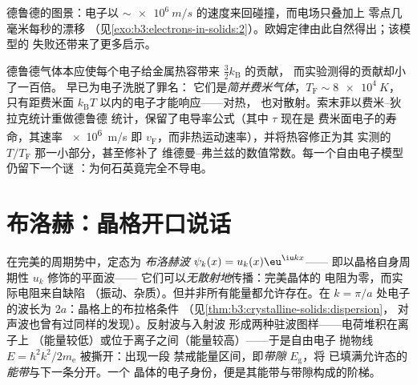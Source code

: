 \begin{omfigure}

{\small 德鲁德的图景：电子以
$\sim\qty{e6}{m/s}$ 的速度来回碰撞，而电场只叠加上
零点几毫米每秒的漂移
（见\cref{exo:b3:electrons-in-solids:2}）。欧姆定律由此自然得出；该模型的
失败还带来了更多启示。}
\end{omfigure}

\begin{remark}[索末菲的补救]\label{rem:b3:electrons-in-solids:sommerfeld}
德鲁德气体本应使每个电子给金属热容带来 $\tfrac32k_{\text{B}}$ 的贡献，
而实验测得的贡献却小了一百倍。
早已为电子洗脱了罪名：
它们是\emph{简并费米气体}，$T_{\text{F}} \sim
\qty{8e4}{K}$，只有距费米面
$k_{\text{B}}T$ 以内的电子才能响应——对热，
也对散射。索末菲以费米–狄拉克统计重做德鲁德
统计，保留了电导率公式（其中 $\tau$ 现在是
费米面电子的寿命，其速率 \qty{e6}{m/s} 即
$v_{\text{F}}$，而非热运动速率），并将热容修正为其
实测的 $T/T_{\text{F}}$ 那一小部分，甚至修补了
维德曼–弗兰兹的数值常数。每一个自由电子模型仍留下一个谜
：为何石英竟完全不导电。
\end{remark}

\section{布洛赫：晶格开口说话}

\begin{theorem}[布洛赫态与带隙]\label{thm:b3:electrons-in-solids:bloch}
在完美的周期势中，定态为
\emph{布洛赫波} $\psi_k(x) = u_k(x)\eu^{\iu kx}$——
即以晶格自身周期性 $u_k$ 修饰的平面波——
它们可以\emph{无散射地}传播：完美晶体的
电阻为零，而实际电阻来自缺陷
（振动、杂质）。但并非所有能量都允许存在。在
$k = \pi/a$ 处电子的波长为 $2a$：晶格上的布拉格条件
（见\cref{thm:b3:crystalline-solids:dispersion}，
对声波也曾有过同样的发现）。反射波与入射波
形成两种驻波图样——电荷堆积在离子上
（能量较低）或位于离子之间（能量较高）——于是自由电子
抛物线 $E = \hbar^2k^2/2m_{\text{e}}$ 被撕开：出现一段
禁戒能量区间，即\emph{带隙} $E_{\text{g}}$，将
已填满允许态的\emph{能带}与下一条分开。一个
晶体的电子身份，便是其能带与带隙构成的阶梯。
\end{theorem}
\admitted


